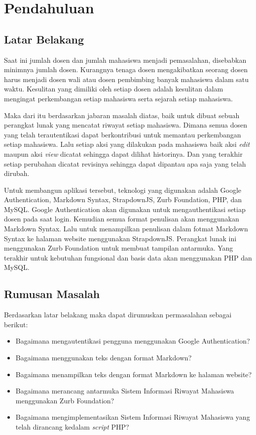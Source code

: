 \chapter{Pendahuluan}
\label{chap:pendahuluan}

\section{Latar Belakang}
\label{sec:latarbelakang}

Saat ini jumlah dosen dan jumlah mahasiswa menjadi pemasalahan, disebabkan
minimnya jumlah dosen. Kurangnya tenaga dosen mengakibatkan seorang dosen harus
menjadi dosen wali atau dosen pembimbing banyak mahasiswa dalam satu waktu.
Kesulitan yang dimiliki oleh setiap dosen adalah kesulitan dalam mengingat
perkembangan setiap mahasiswa serta sejarah setiap mahasiswa.

Maka dari itu berdasarkan jabaran masalah diatas, baik untuk dibuat sebuah
perangkat lunak yang mencatat riwayat setiap mahasiswa. Dimana semua dosen yang
telah terautentikasi dapat berkontribusi untuk memantau perkembangan setiap
mahasiswa. Lalu setiap aksi yang dilakukan pada mahasiswa baik aksi {\it edit}
maupun aksi {\it view} dicatat sehingga dapat dilihat historinya. Dan yang
terakhir setiap perubahan dicatat revisinya sehingga dapat dipantau apa saja
yang telah dirubah.

Untuk membangun aplikasi tersebut, teknologi yang digunakan adalah Google
Authentication, Markdown Syntax, StrapdownJS, Zurb Foundation, PHP, dan MySQL.
Google Authentication akan digunakan untuk mengauthentikasi setiap dosen pada
saat login. Kemudian semua format penulisan akan menggunakan Markdown Syntax.
Lalu untuk menampilkan penulisan dalam fotmat Markdown Syntax ke halaman website
menggunakan StrapdownJS. Perangkat lunak ini menggunakan Zurb Foundation untuk
membuat tampilan antarmuka. Yang terakhir untuk kebutuhan fungsional dan basis
data akan menggunakan PHP dan MySQL.

\section{Rumusan Masalah}
Berdasarkan latar belakang maka dapat dirumuskan permasalahan sebagai berikut:
\begin{itemize}
	\item Bagaimana mengautentikasi pengguna menggunakan Google Authentication?
	\item Bagaimana menggunakan teks dengan format Markdown?
	\item Bagaimana menampilkan teks dengan format Markdown ke halaman website?
	\item Bagaimana merancang antarmuka Sistem Informasi Riwayat Mahasiswa
	menggunakan Zurb Foundation?
	\item Bagaimana mengimplementasikan Sistem Informasi Riwayat Mahasiswa yang
	telah dirancang kedalam {\it script} PHP?
\end{itemize}

